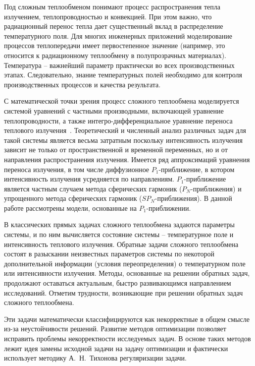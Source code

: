     {\actuality}
    Под сложным теплообменом понимают
    процесс распространения тепла излучением, теплопроводностью и
    конвекцией.
    При этом важно, что радиационный перенос тепла дает
    существенный вклад в распределение температурного поля.
    Для многих инженерных приложений моделирование процессов теплопередачи имеет
    первостепенное значение (например, это относится к радиационному
    теплообмену в полупрозрачных материалах).
    Температура – важнейший параметр практически во всех производственных этапах.
    Следовательно, знание температурных полей необходимо для контроля производственных
    процессов и качества результата.

    С математической точки зрения процесс сложного теплообмена
    моделируется системой уравнений с частными производными, включающей
    уравнение теплопроводности, а также интегро-дифференциальное уравнение
    переноса теплового излучения~\cite{Ozisik1976, Sparrow1971, howell2010thermal, modest2013radiative}.
    Теоретический и численный анализ различных задач для такой системы является весьма
    затратным поскольку интенсивность излучения зависит не только от
    пространственной и временной переменных, но и от направления
    распространения излучения.
    Имеется ряд аппроксимаций уравнения переноса излучения, в том числе диффузионное
    $P_1$-приближение, в котором интенсивность излучения усредняется по направлениям.
    $P_1$-приближение является частным случаем метода сферических гармоник ($P_N$-приближения)
    и упрощенного метода сферических гармоник ($SP_N$-приближения).
    В данной работе рассмотрены модели, основанные на $P_1$-приближении.


    В классических прямых задачах сложного теплообмена задаются
    параметры системы, и по ним вычисляется состояние системы –
    температурное поле и интенсивность теплового излучения.
    Обратные задачи сложного теплообмена состоят в разыскании неизвестных параметров
    системы по некоторой дополнительной информации (условия переопределения)
    о температурном поле или интенсивности излучения.
    Методы, основанные на решении обратных задач, продолжают оставаться
    актуальным, быстро развивающимся направлением исследований.
    Отметим трудности, возникающие при решении обратных задач сложного
    теплообмена.


    Эти задачи математически классифицируются как некорректные в общем
    смысле из-за неустойчивости решений.
    Развитие методов оптимизации позволяет исправить проблемы некорректности исследуемых задач.
    В основе таких методов лежит идея замены исходной задачи на задачу оптимизации и
    фактически использует методику А.\ Н.\ Тихонова регуляризации задачи.


